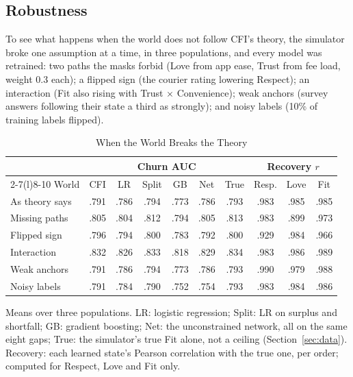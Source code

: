 \documentclass[10pt,twocolumn,letterpaper]{article}
\newcommand{\secref}[1]{Section~\mbox{\ref{#1}}}
\begin{document}
\subsection{Robustness}\label{sec:robust}

To see what happens when the world does not follow CFI's theory, the simulator broke one assumption at a time, in three populations, and every model was retrained: two paths the masks forbid (Love from app ease, Trust from fee load, weight 0.3 each); a flipped sign (the courier rating lowering Respect); an interaction (Fit also rising with Trust $\times$ Convenience); weak anchors (survey answers following their state a third as strongly); and noisy labels (10\% of training labels flipped).

\begin{table}[t]
\caption{When the World Breaks the Theory}\label{tab:robust}
\centering\footnotesize
\setlength{\tabcolsep}{2.6pt}
\begin{tabular}{@{}l c c c c c c c c c@{}}
\toprule
 & \multicolumn{6}{c}{Churn AUC} & \multicolumn{3}{c}{Recovery $r$} \\
\cmidrule(lr){2-7}\cmidrule(l){8-10}
World & CFI & LR & Split & GB & Net & True & Resp. & Love & Fit \\
\midrule
As theory says & .791 & .786 & .794 & .773 & .786 & .793 & .983 & .985 & .985 \\
Missing paths & .805 & .804 & .812 & .794 & .805 & .813 & .983 & .899 & .973 \\
Flipped sign & .796 & .794 & .800 & .783 & .792 & .800 & .929 & .984 & .966 \\
Interaction & .832 & .826 & .833 & .818 & .829 & .834 & .983 & .986 & .989 \\
Weak anchors & .791 & .786 & .794 & .773 & .786 & .793 & .990 & .979 & .988 \\
Noisy labels & .791 & .784 & .790 & .752 & .754 & .793 & .983 & .984 & .986 \\
\bottomrule
\end{tabular}
\par\smallskip\parbox{\columnwidth}{\footnotesize Means over three populations. LR: logistic regression; Split: LR on surplus and shortfall; GB: gradient boosting; Net: the unconstrained network, all on the same eight gaps; True: the simulator's true Fit alone, not a ceiling (\secref{sec:data}). Recovery: each learned state's Pearson correlation with the true one, per order; computed for Respect, Love and Fit only.}
\end{table}
\end{document}
